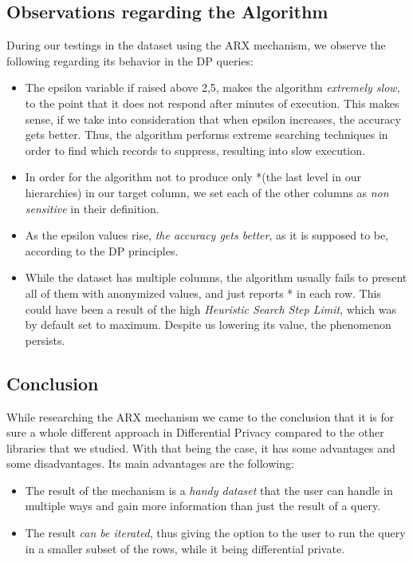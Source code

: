 \subsection{Observations regarding the Algorithm}

During our testings in the dataset using the ARX mechanism, we observe the following regarding its behavior in the DP queries:

\begin{itemize}
    \item The epsilon variable if raised above 2,5, makes the algorithm \emph{extremely slow}, to the point that it does not respond after minutes of execution. This makes sense, if we take into consideration that when epsilon increases, the accuracy gets better. Thus, the algorithm performs extreme searching techniques in order to find which records to suppress, resulting into slow execution.
    \item In order for the algorithm not to produce only *(the last level in our hierarchies) in our target column, we set each of the other columns as \emph{non sensitive} in their definition.
    \item As the epsilon values rise, \emph{the accuracy gets better}, as it is supposed to be, according to the DP principles.
    \item While the dataset has multiple columns, the algorithm usually fails to present all of them with anonymized values, and just reports * in each row. This could have been a result of the high \emph{Heuristic Search Step Limit}, which was by default set to maximum. Despite us lowering its value, the phenomenon persists.
\end{itemize}

\subsection{Conclusion}

While researching the ARX mechanism we came to the conclusion that it is for sure a whole different approach in Differential Privacy compared to the other libraries that we studied. With that being the case, it has some advantages and some disadvantages. Its main advantages are the following:

\begin{itemize}
    \item The result of the mechanism is a \emph{handy dataset} that the user can handle in multiple ways and gain more information than just the result of a query.
    \item The result \emph{can be iterated}, thus giving the option to the user to run the query in a smaller subset of the rows, while it being differential private.

\end{itemize}

